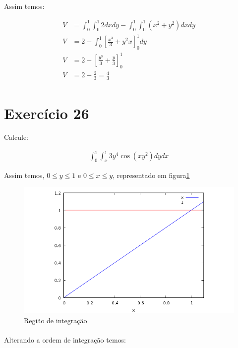 \documentclass{article}
\theoremstyle{definition}
\begin{document}
        Assim temos:

        \begin{align*}
            V &= \int_0^1 \int_0^1 2 dx dy - \int_0^1 \int_0^1 (x^2 + y^2) dx dy\\
            V &= 2 - \int_0^1 \left[ \frac{x^3}{3} + y^2x \right]_0^1 dy\\
            V &= 2 - \left[ \frac{y^3}{3} + \frac{y}{3} \right]_0^1\\
            V &= 2 - \frac{2}{3} = \frac{4}{3}\\
        \end{align*}

    \section{Exercício 26}
        Calcule:

        \begin{align*}
            \int_0^1 \int_x^1 3y^4\cos{(xy^2)} dy dx
        \end{align*}

        Assim temos, $0 \leq y \leq 1$ e $0 \leq x \leq y$, representado em figura\ref{fig:retas-26}

        \begin{figure}[h!]
            \includegraphics[width=\linewidth]{retas-26.png}
            \caption{Região de integração}
            \label{fig:retas-26}
        \end{figure}

        \paragraph{}
        Alterando a ordem de integração temos:
\end{document}
